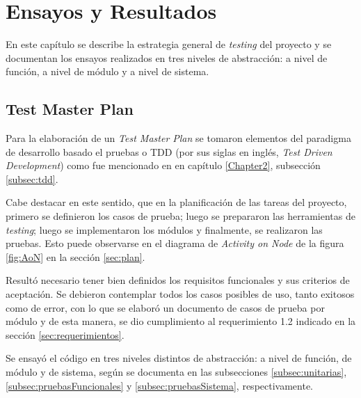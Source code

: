 
\chapter{Ensayos y Resultados} %

\label{Chapter4} %

En este capítulo se describe la estrategia general de \textit{testing} del proyecto y se documentan los ensayos realizados en tres niveles de abstracción: a nivel de función, a nivel de módulo y a nivel de sistema.


\section{Test Master Plan}
\label{sec:masterPlan}

Para la elaboración de un \textit{Test Master Plan} se tomaron elementos del paradigma de desarrollo basado el pruebas o TDD (por sus siglas en inglés, \textit{Test Driven Development}) como fue mencionado en en capítulo \ref{Chapter2}, subsección \ref{subsec:tdd}. 

Cabe destacar en este sentido, que en la planificación de las tareas del proyecto, primero se definieron los casos de prueba; luego se prepararon las herramientas de \textit{testing}; luego se implementaron los módulos y finalmente, se realizaron las pruebas. Esto puede observarse en el diagrama de \textit{Activity on Node} de la figura \ref{fig:AoN} en la sección \ref{sec:plan}.

Resultó necesario tener bien definidos los requisitos funcionales y sus criterios de aceptación.  Se debieron contemplar todos los casos posibles de uso, tanto exitosos como de error, con lo que se elaboró un documento \citep{TestMasterPlan} de casos de prueba por módulo  y de esta manera, se dio cumplimiento al requerimiento 1.2 indicado en la sección \ref{sec:requerimientos}.  

Se ensayó el código en tres niveles distintos de abstracción: a nivel de función, de módulo y de sistema, según se documenta en las subsecciones \ref{subsec:unitarias}, \ref{subsec:pruebasFuncionales} y \ref{subsec:pruebasSistema}, respectivamente. 

